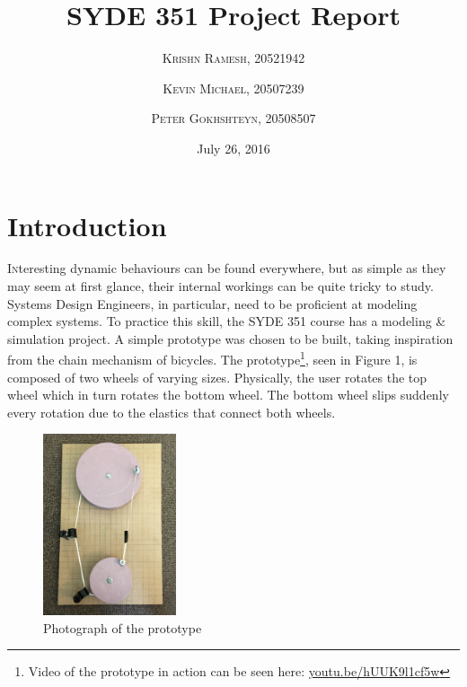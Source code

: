 \documentclass[twoside,twocolumn]{article}
\title{SYDE 351 Project Report} %
\author{%
\textsc{Krishn Ramesh, 20521942} \\[1ex]
\and
\textsc{Kevin Michael, 20507239} \\[1ex]
\and
\textsc{Peter Gokhshteyn, 20508507} \\[1ex]
}
\date{July 26, 2016} %
\begin{document}
\maketitle


\section{Introduction}

\lettrine[nindent=0em,lines=3]{I} nteresting dynamic behaviours can be found everywhere, but as simple as they may seem at first glance, their internal workings can be quite tricky to study. Systems Design Engineers, in particular, need to be proficient at modeling complex systems. To practice this skill, the SYDE 351 course has a modeling \& simulation project. A simple prototype was chosen to be built, taking inspiration from the chain mechanism of bicycles. The prototype\footnote{Video of the prototype in action can be seen here: \href{url}{youtu.be/hUUK9l1cf5w}}, seen in Figure 1, is composed of two wheels of varying sizes. Physically, the user rotates the top wheel which in turn rotates the bottom wheel. The bottom wheel slips suddenly every rotation due to the elastics that connect both wheels.

\begin{figure}[!ht]
    \caption{Photograph of the prototype}
    \centering
        \includegraphics[width=0.35\textwidth]{prototype.jpg}
\end{figure}


\end{document}
